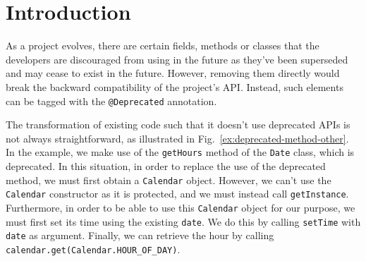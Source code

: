 \documentclass[sigconf,review,anonymous]{acmart}
\begin{document}






\section{Introduction}\label{sec:intro}







As a project evolves, there are certain fields, methods or classes
that the developers are discouraged from using in the future as
they've been superseded and may cease to exist in the future.
However, removing them directly would break the backward compatibility
of the project's API.  Instead, such elements can be tagged with the
\texttt{@Deprecated} annotation.  %


The transformation of existing code such that it doesn't use
deprecated APIs is not always straightforward, as illustrated in
Fig.~\ref{ex:deprecated-method-other}. In the example, we make use of
the \texttt{getHours} method of the \texttt{Date} class, which is
deprecated.  In this situation, in order to replace the use of the
deprecated method, we must first obtain a \texttt{Calendar} object.
However, we can't use the \texttt{Calendar} constructor as it is
protected, and we must instead call \texttt{getInstance}.
Furthermore, in order to be able to use this \texttt{Calendar} object
for our purpose, we must first set its time using the existing
\texttt{date}.  We do this by calling \texttt{setTime} with
\texttt{date} as argument.  Finally, we can retrieve the hour by
calling \texttt{calendar.get(Calendar.HOUR\_OF\_DAY)}.
\end{document}
